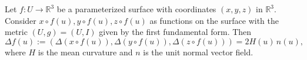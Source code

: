 Let $f: U \to \mathbb{R}^3$ be a parameterized surface with coordinates $(x, y, z)$ in $\mathbb{R}^3$. Consider $x \circ f(u), y \circ f(u), z \circ f(u)$ as functions on the surface with the metric $(U, g) = (U, I)$ given by the first fundamental form. Then
$$\Delta f(u) := (\Delta(x \circ f(u)), \Delta(y \circ f(u)), \Delta(z \circ f(u))) = 2H(u) \, n(u),$$
where $H$ is the mean curvature and $n$ is the unit normal vector field.